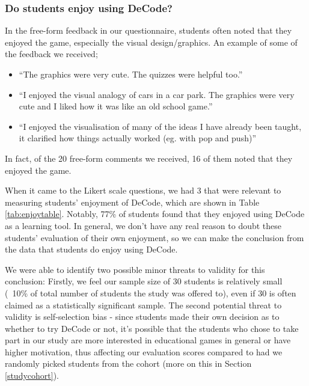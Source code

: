 \documentclass[11pt]{article}
\begin{document}
\subsubsection{Do students enjoy using DeCode?}
In the free-form feedback in our questionnaire, students often noted that they enjoyed the game, especially the visual design/graphics. An example of some of the feedback we received;
\begin{spacing}{1.5}
\begin{itemize}
  \item ``The graphics were very cute. The quizzes were helpful too.''
  \item ``I enjoyed the visual analogy of cars in a car park. The graphics were very cute and I liked how it was like an old school game.''
  \item ``I enjoyed the visualisation of many of the ideas I have already been taught, it clarified how things actually worked (eg. with pop and push)''
\end{itemize}
\end{spacing}
In fact, of the 20 free-form comments we received, 16 of them noted that they enjoyed the game.\par
When it came to the Likert scale questions, we had 3 that were relevant to measuring students' enjoyment of DeCode, which are shown in Table \ref{tab:enjoytable}. Notably, 77\% of students found that they enjoyed using DeCode as a learning tool. In general, we don't have any real reason to doubt these students' evaluation of their own enjoyment, so we can make the conclusion from the data that students do enjoy using DeCode.\par
We were able to identify two possible minor threats to validity for this conclusion: Firstly, we feel our sample size of 30 students is relatively small (~10\% of total number of students the study was offered to), even if 30 is often claimed as a statistically significant sample. The second potential threat to validity is self-selection bias - since students made their own decision as to whether to try DeCode or not, it's possible that the students who chose to take part in our study are more interested in educational games in general or have higher motivation, thus affecting our evaluation scores compared to had we randomly picked students from the cohort (more on this in Section \ref{studycohort}).
\end{document}
